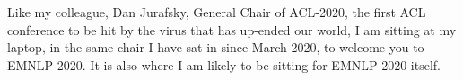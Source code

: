 Like my colleague, Dan Jurafsky, General Chair of ACL-2020, the first ACL conference to be hit by the
virus that has up-ended our world, I am sitting at my laptop, in the same chair I have sat in since March
2020, to welcome you to EMNLP-2020. It is also where I am likely to be sitting for EMNLP-2020 itself.
